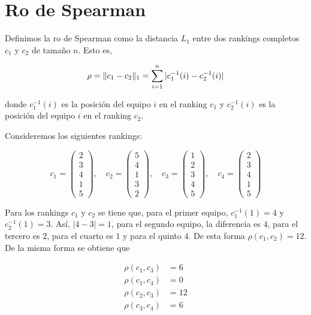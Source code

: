 \section{Ro de Spearman}

\begin{defi}[Ro de Spearman]
Definimos la ro de Spearman como la distancia $L_1$ entre dos rankings completos $c_1$ y $c_2$ de tamaño $n$. Esto es, 

\begin{equation}
\rho = \lVert c_1 - c_2 \rVert_1 = \sum\limits_{i=1}^{n} |c_1^{-1}(i) - c_2^{-1}(i)|
\end{equation}

donde $c_1^{-1}(i)$ es la posición del equipo $i$ en el ranking $c_1$ y $c_2^{-1}(i)$ es la posición del equipo $i$ en el ranking $c_2$.
\end{defi}

\begin{ejemplo}
Consideremos los siguientes rankings:

\begin{equation*}
c_1 = \left( \begin{array}{c}
2\\
3\\
4\\
1\\
5
\end{array} \right), \quad
c_2 = \left( \begin{array}{c}
5\\
4\\
1\\
3\\
2
\end{array} \right), \quad
c_3 = \left( \begin{array}{c}
1\\
2\\
3\\
4\\
5
\end{array} \right), \quad
c_4 = \left( \begin{array}{c}
2\\
3\\
4\\
1\\
5
\end{array} \right)
\end{equation*}

Para los rankings $c_1$ y $c_2$ se tiene que, para el primer equipo, $c_1^{-1}(1) = 4$ y $c_2^{-1}(1) = 3$. Así, $|4-3| = 1$, para el segundo equipo, la diferencia es $4$, para el tercero es $2$, para el cuarto es $1$ y para el quinto $4$. De esta forma $\rho(c_1, c_2) = 12$. De la misma forma se obtiene que 

\begin{align*}
\rho(c_1, c_3) & = 6\\
\rho(c_1, c_4) & = 0\\
\rho(c_2, c_3) & = 12\\
\rho(c_3, c_4) & = 6
\end{align*}  
\end{ejemplo}

